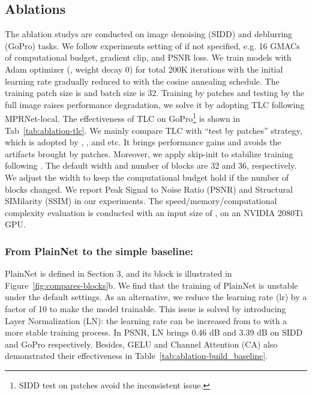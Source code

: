 \documentclass[runningheads]{llncs}
\begin{document}
\subsection{Ablations}
The ablation studys are conducted on image denoising (SIDD\cite{SIDD_2018_CVPR}) and deblurring (GoPro\cite{nah2017deep}) tasks. 
 We follow experiments setting of \cite{chen2021hinet} if not specified, e.g. 16 GMACs of computational budget, gradient clip, and PSNR loss.
We train models with Adam\cite{kingma2014adam} optimizer (, weight decay 0) for total 200K iterations with the initial learning rate  gradually reduced to  with the cosine annealing schedule\cite{loshchilov2016sgdr}. The training patch size is  and batch size is 32. Training by patches and testing by the full image raises performance degradation\cite{chu2021revisiting}, we solve it by adopting TLC\cite{chu2021revisiting} following MPRNet-local\cite{chu2021revisiting}. 
The effectiveness of TLC on GoPro\footnote{SIDD test on  patches avoid the inconsistent issue.} is shown in Tab~\ref{tab:ablation-tlc}. We mainly compare TLC with ``test by patches'' strategy, which is adopted by \cite{chen2021hinet}, \cite{mao2021deep}, and etc. It brings performance gains and avoids the artifacts brought by patches.
Moreover,  we apply skip-init\cite{de2020batch} to stabilize training following \cite{liu2022convnet}. The default width and number of blocks are 32 and 36, respectively. We adjust the width to keep the computational budget hold if the number of blocks changed. 
We report Peak Signal to Noise Ratio (PSNR) and Structural SIMilarity (SSIM) in our experiments. The speed/memory/computational complexity evaluation is conducted with an input size of , on an NVIDIA 2080Ti GPU. 




\subsubsection{From PlainNet to the simple baseline:} PlainNet is defined in Section 3, and its block is illustrated in Figure~\ref{fig:compares-blocks}b. We find that the training of PlainNet is unstable under the default settings. As an alternative, we reduce the learning rate (lr) by a factor of 10 to make the model trainable. This issue is solved by introducing Layer Normalization (LN): the learning rate can be increased from  to  with a more stable training process. In PSNR, LN brings 0.46 dB and 3.39 dB on SIDD and GoPro respectively. Besides, GELU and Channel Attention (CA) also demonstrated their effectiveness in Table~\ref{tab:ablation-build_baseline}. 
\end{document}
